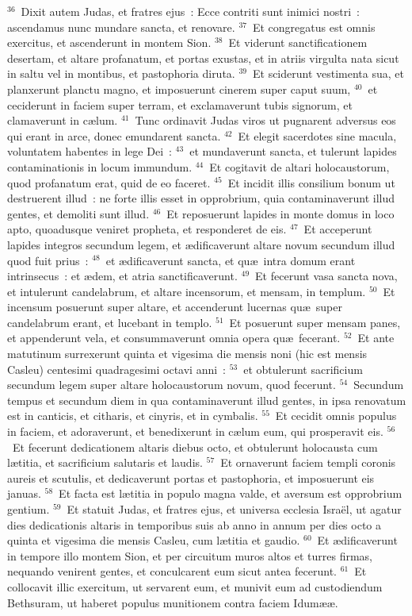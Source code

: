 ${}^{36}$~Dixit autem Judas, et fratres ejus~: Ecce contriti sunt inimici nostri~: ascendamus nunc mundare sancta, et renovare.
${}^{37}$~Et congregatus est omnis exercitus, et ascenderunt in montem Sion.
${}^{38}$~Et viderunt sanctificationem desertam, et altare profanatum, et portas exustas, et in atriis virgulta nata sicut in saltu vel in montibus, et pastophoria diruta.
${}^{39}$~Et sciderunt vestimenta sua, et planxerunt planctu magno, et imposuerunt cinerem super caput suum,
${}^{40}$~et ceciderunt in faciem super terram, et exclamaverunt tubis signorum, et clamaverunt in c\ae lum.
${}^{41}$~Tunc ordinavit Judas viros ut pugnarent adversus eos qui erant in arce, donec emundarent sancta.
${}^{42}$~Et elegit sacerdotes sine macula, voluntatem habentes in lege Dei~:
${}^{43}$~et mundaverunt sancta, et tulerunt lapides contaminationis in locum immundum.
${}^{44}$~Et cogitavit de altari holocaustorum, quod profanatum erat, quid de eo faceret.
${}^{45}$~Et incidit illis consilium bonum ut destruerent illud~: ne forte illis esset in opprobrium, quia contaminaverunt illud gentes, et demoliti sunt illud.
${}^{46}$~Et reposuerunt lapides in monte domus in loco apto, quoadusque veniret propheta, et responderet de eis.
${}^{47}$~Et acceperunt lapides integros secundum legem, et \ae dificaverunt altare novum secundum illud quod fuit prius~:
${}^{48}$~et \ae dificaverunt sancta, et qu\ae\ intra domum erant intrinsecus~: et \ae dem, et atria sanctificaverunt.
${}^{49}$~Et fecerunt vasa sancta nova, et intulerunt candelabrum, et altare incensorum, et mensam, in templum.
${}^{50}$~Et incensum posuerunt super altare, et accenderunt lucernas qu\ae\ super candelabrum erant, et lucebant in templo.
${}^{51}$~Et posuerunt super mensam panes, et appenderunt vela, et consummaverunt omnia opera qu\ae\ fecerant.
${}^{52}$~Et ante matutinum surrexerunt quinta et vigesima die mensis noni (hic est mensis Casleu) centesimi quadragesimi octavi anni~:
${}^{53}$~et obtulerunt sacrificium secundum legem super altare holocaustorum novum, quod fecerunt.
${}^{54}$~Secundum tempus et secundum diem in qua contaminaverunt illud gentes, in ipsa renovatum est in canticis, et citharis, et cinyris, et in cymbalis.
${}^{55}$~Et cecidit omnis populus in faciem, et adoraverunt, et benedixerunt in c\ae lum eum, qui prosperavit eis.
${}^{56}$~Et fecerunt dedicationem altaris diebus octo, et obtulerunt holocausta cum l\ae titia, et sacrificium salutaris et laudis.
${}^{57}$~Et ornaverunt faciem templi coronis aureis et scutulis, et dedicaverunt portas et pastophoria, et imposuerunt eis januas.
${}^{58}$~Et facta est l\ae titia in populo magna valde, et aversum est opprobrium gentium.
${}^{59}$~Et statuit Judas, et fratres ejus, et universa ecclesia Isra\"el, ut agatur dies dedicationis altaris in temporibus suis ab anno in annum per dies octo a quinta et vigesima die mensis Casleu, cum l\ae titia et gaudio.
${}^{60}$~Et \ae dificaverunt in tempore illo montem Sion, et per circuitum muros altos et turres firmas, nequando venirent gentes, et conculcarent eum sicut antea fecerunt.
${}^{61}$~Et collocavit illic exercitum, ut servarent eum, et munivit eum ad custodiendum Bethsuram, ut haberet populus munitionem contra faciem Idum\ae \ae .

